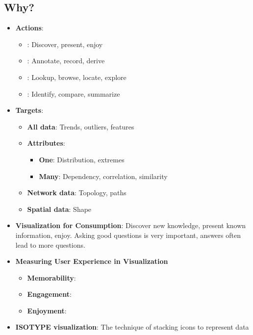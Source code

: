 \documentclass{report}
\begin{document}
    \subsection{Why?}
    \begin{itemize}
        \item \textbf{Actions}: 
            \begin{itemize}
                \item {}: Discover, present, enjoy
                \item {}: Annotate, record, derive
                \item {}: Lookup, browse, locate, explore
                \item {}: Identify, compare, summarize
            \end{itemize}
        \item \textbf{Targets}:
            \begin{itemize}
                \item \textbf{All data}: Trends, outliers, features
                \item \textbf{Attributes}: 
                    \begin{itemize}
                        \item \textbf{One}: Distribution, extremes
                        \item \textbf{Many}: Dependency, correlation, similarity
                    \end{itemize}
                \item \textbf{Network data}: Topology, paths
                \item \textbf{Spatial data}: Shape
            \end{itemize}
        \item \textbf{Visualization for Consumption}: Discover new knowledge, present known information, enjoy. Asking good questions is very important, answers often lead to more questions.
        \item \textbf{Measuring User Experience in Visualization}
            \begin{itemize}
                \item \textbf{Memorability}:
                \item \textbf{Engagement}:
                \item \textbf{Enjoyment}:
            \end{itemize}
        \item \textbf{ISOTYPE visualization}: The technique of stacking icons to represent data
    \end{itemize}
    \pagebreak 
\end{document}
